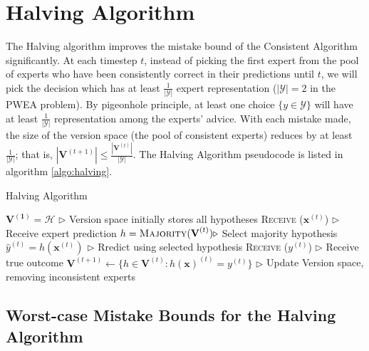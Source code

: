 \documentclass[11pt]{article}
\newcommand{\Y}{\mathcal{Y}}
\newcommand{\V}{\mathbf{V}}
\begin{document}
\section{Halving Algorithm}
The Halving algorithm improves the mistake bound of the Consistent Algorithm significantly. At each timestep $t$, instead of picking the first expert from the pool of experts who have been consistently correct in their predictions until $t$, we will pick the decision which has at least $\frac{1}{|\Y|}$ expert representation ($|\Y| = 2$ in the PWEA problem). By pigeonhole principle, at least one choice $\{y\in \Y\}$ will have at least $\frac{1}{|\Y|}$ representation among the experts' advice. With each mistake made, the size of the version space (the pool of consistent experts) reduces by at least $\frac{1}{|\Y|}$; that is, $|\V^{(t+1)}| \le \frac{|\V^{(t)}|}{|\Y|}$.\cite{slides} The Halving Algorithm pseudocode is listed in algorithm \ref{algo:halving}.

\begin{algorithm}[H]
\caption{Halving Algorithm}
\label{algo:halving}
\begin{algorithmic}[1]
\STATE $\mathbf{V^{(1)}} = \mathcal{H}$  \hfill $\triangleright$ Version space initially stores all hypotheses
\STATE \textsc{Receive} ($\textbf{x}^{(t)}$) \hfill $\triangleright$ Receive expert prediction
\STATE $h =\textsc{Majority}(\textbf{V}^{(t)}) \hfill \triangleright$ Select majority hypothesis 
\STATE $\hat{y}^{(t)} = h(\mathbf{x}^{(t)})$ \hfill $\triangleright$ Rredict using selected hypothesis
\STATE \textsc{Receive} ($y^{(t)}$) \hfill $\triangleright$ Receive true outcome
\STATE $\mathbf{V}^{(t+1)}\leftarrow \{ h \in \mathbf{V}^{(t)} : h(\textbf{x})^{(t)}=y^{(t)} \}$ \hfill $\triangleright$ Update Version space, removing inconsistent experts
\ENDFOR
\end{algorithmic}
\end{algorithm}

\subsection{Worst-case Mistake Bounds for the Halving Algorithm}
\end{document}
